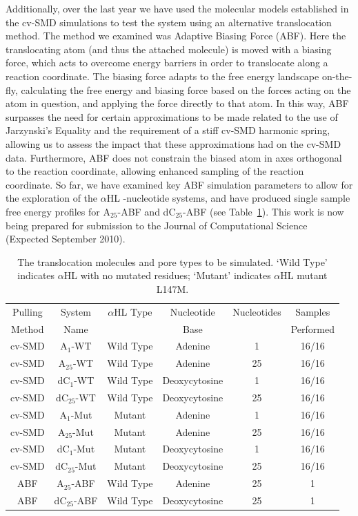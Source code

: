 \documentclass[a4paper,10pt]{article}
\newcommand{\dctfnsp}{dC$_{25}$}
\newcommand{\atfnsp}{A$_{25}$}
\newcommand{\dconsp}{dC$_{1}$}
\newcommand{\aonsp}{A$_{1}$}
\newcommand{\ahl}{$\alpha$HL }
\newcommand{\up}{\vspace*{-1em}}
\begin{document}
Additionally, over the last year we have used the molecular models established in the cv-SMD simulations to test the system using an alternative translocation method. The method we examined was Adaptive Biasing Force (ABF). Here the translocating atom (and thus the attached molecule) is moved with a biasing force, which acts to overcome energy barriers in order to translocate along a reaction coordinate. The biasing force adapts to the free energy landscape on-the-fly, calculating the free energy and biasing force based on the forces acting on the atom in question, and applying the force directly to that atom. In this way, ABF surpasses the need for certain approximations to be made related to the use of Jarzynski's Equality and the requirement of a stiff cv-SMD harmonic spring, allowing us to assess the impact that these approximations had on the cv-SMD data. Furthermore, ABF does not constrain the biased atom in axes orthogonal to the reaction coordinate, allowing enhanced sampling of the reaction coordinate. So far, we have examined key ABF simulation parameters to allow for the exploration of the \ahl-nucleotide systems, and have produced single sample free energy profiles for \atfnsp-ABF and \dctfnsp-ABF (see Table~\ref{table:systems1}). This work is now being prepared for submission to the Journal of Computational Science (Expected September 2010).

\up
\begin{table}[!h]
\begin{center}
  \caption{The translocation molecules and pore types to be simulated. `Wild Type' indicates \ahl with no mutated residues; `Mutant' indicates \ahl mutant L147M.\newline }
\label{table:systems1}
\begin{tabular}{| c | c | c | c | c | c |}
\hline
Pulling & System & \ahl Type & Nucleotide & Nucleotides & Samples \\
Method & Name &  & Base &  & Performed \\
\hline
cv-SMD & \aonsp-WT & Wild Type & Adenine & 1 & 16/16  \\
cv-SMD & \atfnsp-WT & Wild Type & Adenine & 25 & 16/16  \\
cv-SMD & \dconsp-WT & Wild Type & Deoxycytosine & 1 & 16/16  \\
cv-SMD & \dctfnsp-WT & Wild Type & Deoxycytosine & 25 & 16/16 \\
cv-SMD & \aonsp-Mut & Mutant & Adenine & 1 & 16/16  \\
cv-SMD & \atfnsp-Mut & Mutant & Adenine & 25 & 16/16  \\
cv-SMD & \dconsp-Mut & Mutant & Deoxycytosine & 1 & 16/16  \\
cv-SMD & \dctfnsp-Mut & Mutant & Deoxycytosine & 25 & 16/16  \\
ABF & \atfnsp-ABF & Wild Type & Adenine & 25 & 1  \\
ABF & \dctfnsp-ABF & Wild Type & Deoxycytosine & 25 & 1  \\
\hline
\end{tabular}
\end{center}
\end{table}
\up
\end{document}
